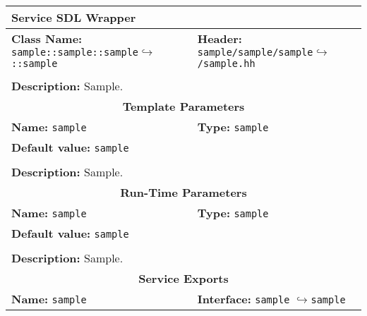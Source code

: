 \newpage
\begin{center}
	\begin{tabular}{|p{7.5cm}|p{7.5cm}|}
		\hline
		\multicolumn{2}{|l|}{\textbf{\Large Service SDL Wrapper}}\\
		\hline
		\multicolumn{1}{|p{7.5cm}}{\textbf{Class Name:} \newline \texttt{sample::sample::sample}\newline$\hookrightarrow$\texttt{::sample}} & \multicolumn{1}{p{7.5cm}|}{\textbf{Header:} \newline \texttt{sample/sample/sample}\newline$\hookrightarrow$\texttt{/sample.hh}}\\
		\multicolumn{2}{|l|}{}\\
		\multicolumn{2}{|p{15cm}|}{\textbf{Description:} \newline Sample.}\\
		\hline
		\hline
		\multicolumn{2}{|c|}{\textbf{\large Template Parameters}}\\
		\hline
		\multicolumn{1}{|p{7.5cm}}{\textbf{Name:} \texttt{sample}} & \multicolumn{1}{p{7.5cm}|}{\textbf{Type:} \texttt{sample}}\\
		\multicolumn{2}{|p{15cm}|}{\textbf{Default value:} \texttt{sample}}\\
		\multicolumn{2}{|l|}{}\\
		\multicolumn{2}{|p{15cm}|}{\textbf{Description:} \newline Sample.}\\
		\hline
		\hline
		\multicolumn{2}{|c|}{\textbf{\large Run-Time Parameters}}\\
		\hline
		\multicolumn{1}{|p{7.5cm}}{\textbf{Name:} \texttt{sample}} & \multicolumn{1}{p{7.5cm}|}{\textbf{Type:} \texttt{sample}}\\
		\multicolumn{2}{|p{15cm}|}{\textbf{Default value:} \texttt{sample}}\\
		\multicolumn{2}{|l|}{}\\
		\multicolumn{2}{|p{15cm}|}{\textbf{Description:} \newline Sample.}\\
		\hline
		\hline
		\multicolumn{2}{|c|}{\textbf{\large Service Exports}}\\
		\hline
		\multicolumn{1}{|p{7.5cm}}{\textbf{Name:} \texttt{sample}} & \multicolumn{1}{p{7.5cm}|}{\textbf{Interface:} \newline \texttt{sample} \newline$\hookrightarrow$\texttt{sample}}\\

\end{tabular}
\end{center}
